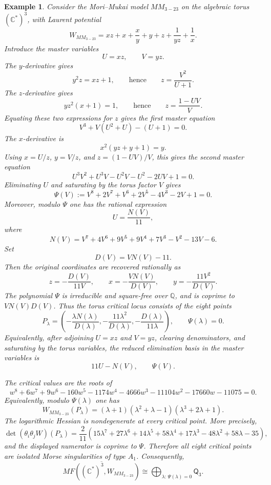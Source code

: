 \documentclass[11pt]{amsart}
\newtheorem{example}{Example}[section]
\newcommand{\MorseCat}[1]{\mathsf{Q}_{#1}}
\begin{document}
\begin{example}
Consider the Mori--Mukai model $MM_{3-23}$ on the algebraic torus
$(\mathbb{C}^*)^3$, with Laurent potential
\[
W_{MM_{3-23}}=xz+x+\frac{x}{y}+y+z+\frac{1}{yz}+\frac{1}{x}.
\]
Introduce the master variables
\[
U=xz,
\qquad
V=yz.
\]
The $y$-derivative gives
\[
y^2z=xz+1,
\qquad\text{hence}\qquad
z=\frac{V^2}{U+1}.
\]
The $z$-derivative gives
\[
yz^2(x+1)=1,
\qquad\text{hence}\qquad
z=\frac{1-UV}{V}.
\]
Equating these two expressions for $z$ gives the first master equation
\[
V^3+V(U^2+U)-(U+1)=0.
\]
The $x$-derivative is
\[
x^2(yz+y+1)=y.
\]
Using $x=U/z$, $y=V/z$, and $z=(1-UV)/V$, this gives the second master equation
\[
U^3V^2+U^3V-U^2V-U^2-2UV+1=0.
\]
Eliminating $U$ and saturating by the torus factor $V$ gives
\[
\Psi(V):=V^8+2V^7+V^6+2V^5-4V^3-2V+1=0.
\]
Moreover, modulo $\Psi$ one has the rational expression
\[
U=\frac{N(V)}{11},
\]
where
\[
N(V)=V^7+4V^6+9V^5+9V^4+7V^3-V^2-13V-6.
\]
Set
\[
D(V)=VN(V)-11.
\]
Then the original coordinates are recovered rationally as
\[
z=-\frac{D(V)}{11V},
\qquad
x=-\frac{VN(V)}{D(V)},
\qquad
y=-\frac{11V^2}{D(V)}.
\]
The polynomial $\Psi$ is irreducible and square-free over $\mathbb{Q}$, and is
coprime to $V N(V)D(V)$. Thus the torus critical locus consists of the eight
points
\[
P_\lambda=\left(-\frac{\lambda N(\lambda)}{D(\lambda)},
-\frac{11\lambda^2}{D(\lambda)},
-\frac{D(\lambda)}{11\lambda}\right),
\qquad
\Psi(\lambda)=0.
\]
Equivalently, after adjoining $U=xz$ and $V=yz$, clearing denominators, and
saturating by the torus variables, the reduced elimination basis in the master
variables is
\[
11U-N(V),
\qquad
\Psi(V).
\]

The critical values are the roots of
\[
w^8+6w^7+9w^6-160w^5-1174w^4-4666w^3
-11104w^2-17660w-11075=0.
\]
Equivalently, modulo $\Psi(\lambda)$ one has
\[
W_{MM_{3-23}}(P_\lambda)=
(\lambda+1)(\lambda^2+
\lambda-1)(\lambda^3+2\lambda+1).
\]
The logarithmic Hessian is nondegenerate at every critical point. More
precisely,
\[
\det(\theta_i\theta_jW)(P_\lambda)
=\frac{2}{11}(15\lambda^7+27\lambda^6+14\lambda^5+58\lambda^4
+17\lambda^3-48\lambda^2+58\lambda-35),
\]
and the displayed numerator is coprime to $\Psi$. Therefore all eight critical
points are isolated Morse singularities of type $A_1$. Consequently,
\[
\overline{MF((\mathbb{C}^*)^3,W_{MM_{3-23}})}
\cong \bigoplus_{\lambda:\,\Psi(\lambda)=0}\MorseCat{3}.
\]
\end{example}
\end{document}
